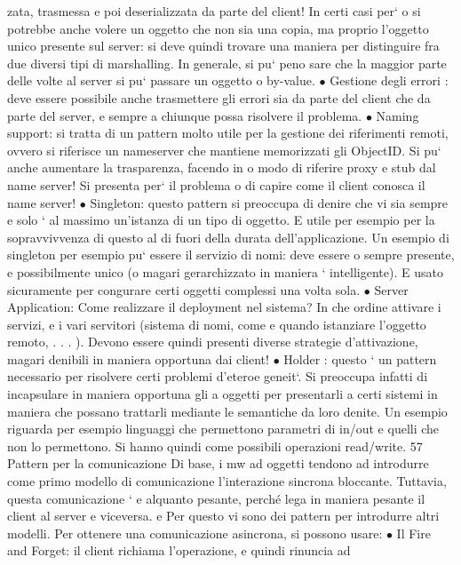\documentclass[a4paper,12pt]{article}
\begin{document}
zata, trasmessa e poi deserializzata da parte del client! In certi casi per`
o
si potrebbe anche volere un oggetto che non sia una copia, ma proprio
l'oggetto unico presente sul server: si deve quindi trovare una maniera per
distinguire fra due diversi tipi di marshalling. In generale, si pu` peno
sare che la maggior parte delle volte al server si pu` passare un oggetto
o
by-value.
$\bullet$ Gestione degli errori : deve essere possibile anche trasmettere gli errori
sia da parte del client che da parte del server, e sempre a chiunque possa
risolvere il problema.
$\bullet$ Naming support: si tratta di un pattern molto utile per la gestione dei
riferimenti remoti, ovvero si riferisce un nameserver che mantiene memorizzati gli ObjectID. Si pu` anche aumentare la
trasparenza, facendo in
o
modo di riferire proxy e stub dal name server! Si presenta per` il problema
o
di capire come il client conosca il name server!
$\bullet$ Singleton: questo pattern si preoccupa di denire che vi sia sempre e solo
`
al massimo un'istanza di un tipo di oggetto. E utile per esempio per
la sopravvivvenza di questo al di fuori della durata dell'applicazione. Un
esempio di singleton per esempio pu` essere il servizio di nomi: deve essere
o
sempre presente, e possibilmente unico (o magari gerarchizzato in maniera
`
intelligente). E usato sicuramente per congurare certi oggetti complessi
una volta sola.
$\bullet$ Server Application: Come realizzare il deployment nel sistema? In che
ordine attivare i servizi, e i vari servitori (sistema di nomi, come e quando
istanziare l'oggetto remoto, . . . ). Devono essere quindi presenti diverse
strategie d'attivazione, magari denibili in maniera opportuna dai client!
$\bullet$ Holder : questo ` un pattern necessario per risolvere certi problemi d'eteroe
geneit`. Si preoccupa infatti di incapsulare in maniera opportuna gli
a
oggetti per presentarli a certi sistemi in maniera che possano trattarli
mediante le semantiche da loro denite. Un esempio riguarda per esempio linguaggi che permettono parametri di in/out e
quelli che non lo
permettono. Si hanno quindi come possibili operazioni read/write.
57
Pattern per la comunicazione
Di base, i mw ad oggetti tendono ad introdurre come primo modello di comunicazione l'interazione sincrona bloccante.
Tuttavia, questa comunicazione `
e
alquanto pesante, perché lega in maniera pesante il client al server e viceversa.
e
Per questo vi sono dei pattern per introdurre altri modelli.
Per ottenere una comunicazione asincrona, si possono usare:
$\bullet$ Il Fire and Forget: il client richiama l'operazione, e quindi rinuncia ad
\end{document}
